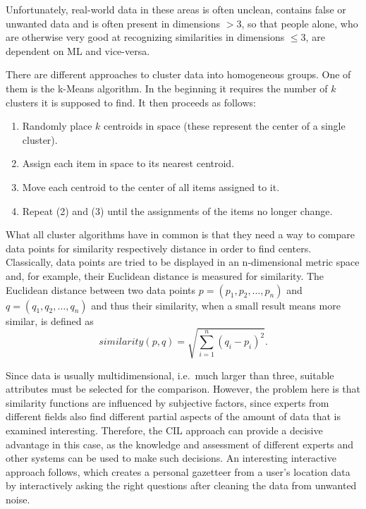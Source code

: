 \documentclass[conference]{IEEEtran}
\begin{document}
Unfortunately, real-world data in these areas is often unclean, contains false or unwanted data and is often present in 
dimensions $>$3, so that people alone, who are otherwise very good at recognizing similarities in dimensions $\le3$, are dependent on ML and vice-versa.

There are different approaches to cluster data into homogeneous groups. One of them is the k-Means algorithm\cite{FoundationsOfML:mohri}. In the beginning it requires the number of $k$ clusters it is supposed to find. It then proceeds as follows: 
\begin{enumerate}
    \item Randomly place $k$ centroids in space (these represent the center of a single cluster).
    \item Assign each item in space to its nearest centroid.
    \item Move each centroid to the center of all items assigned to it.
    \item Repeat (2) and (3) until the assignments of the items no longer change.
\end{enumerate}

What all cluster algorithms have in common is that they need a way to compare data points for similarity respectively distance 
in order to find centers.
Classically, data points are tried to be displayed in an n-dimensional metric space and, for example, their Euclidean distance is measured for similarity.
The Euclidean distance between two data points $p = (p_1, p_2, \dots, p_n)$ and $q = (q_1, q_2, \dots, q_n)$ and thus their
similarity, when a small result means more similar, is defined as
\begin{equation*}
    similarity(p, q) = \sqrt{\sum_{i=1}^{n} (q_i - p_i)^{2}}.
\end{equation*}

Since data is usually multidimensional, i.e.\ much larger than three, suitable attributes must be selected for the comparison. 
However, the problem here is that similarity functions are influenced by subjective factors, since experts from different 
fields also find different partial aspects of the amount of data that is examined interesting.
Therefore, the CIL approach can provide a decisive advantage in this case, as the knowledge and assessment of 
different experts and other systems can be used to make such decisions.
An interesting interactive approach follows\cite{DJ:frankowski}, which creates a personal gazetteer from a user's location data 
by interactively asking the right questions after cleaning the data from unwanted noise.
\end{document}
